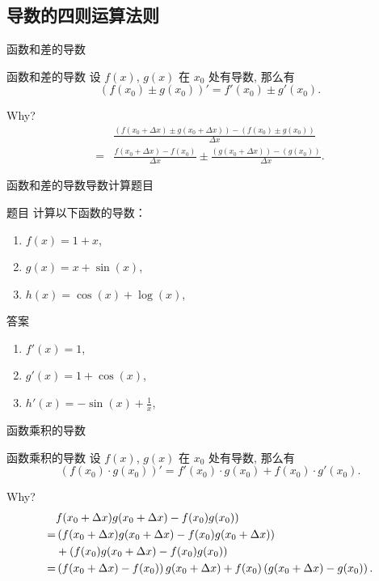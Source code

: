 \documentclass[
10pt,
aspectratio=43,
]{beamer}
\begin{document}
\subsection{导数的四则运算法则}
\begin{frame}{函数和差的导数}
	\begin{block}{函数和差的导数}
		设 $f(x)$, $g(x)$ 在 $x_0$ 处有导数, 那么有
		\[
			(f(x_0)\pm g(x_0))' = f'(x_0)\pm g'(x_0).
		\]
	\end{block}
	\pause
	Why?
	\pause
	\begin{align*}
		  & \frac{(f(x_0+\Delta x)\pm g(x_0+\Delta x))-(f(x_0)\pm g(x_0))}{\Delta x}                  \\
		= & \frac{f(x_0+\Delta x)-f(x_0)}{\Delta x}\pm \frac{( g(x_0+\Delta x))-( g(x_0))}{\Delta x}. 
	\end{align*}
\end{frame}

\begin{frame}{函数和差的导数}{导数计算题目}
	\begin{block}{题目}
		计算以下函数的导数：
		\begin{enumerate}
			\item $f(x) = 1 + x$,
			\item $g(x) = x + \sin(x)$,
			\item $h(x) = \cos(x) + \log(x)$,
		\end{enumerate}
	\end{block}
			
	\pause
			
	\begin{block}{答案}
		\begin{enumerate}
			\item $f'(x) = 1$,
			\item $g'(x) = 1 + \cos(x)$,
			\item $h'(x) = -\sin(x) + \displaystyle\frac{1}{x}$,
		\end{enumerate}
	\end{block}
\end{frame}

\begin{frame}{函数乘积的导数}
	\begin{block}{函数乘积的导数}
		设 $f(x)$, $g(x)$ 在 $x_0$ 处有导数, 那么有
		\[
			(f(x_0)\cdot g(x_0))' = f'(x_0)\cdot g(x_0) + f(x_0)\cdot g'(x_0).
		\]
	\end{block}
	\pause
	Why?
	\pause
	\begin{align*}
		  & f(x_0+\Delta x)g(x_0+\Delta x)-f(x_0) g(x_0))                                                 \\\bigskip
		= & \left(f(x_0+\Delta x)g(x_0+\Delta x)-f(x_0) g(x_0+\Delta x)\right)                            \\\smallskip
		  & + \left(f(x_0)g(x_0+\Delta x)-f(x_0) g(x_0)\right)                                            \\\bigskip
		= & \left(f(x_0+\Delta x)-f(x_0)\right)g(x_0+\Delta x)+f(x_0)\left(g(x_0+\Delta x)-g(x_0)\right). 
	\end{align*}
\end{frame}
\end{document}
